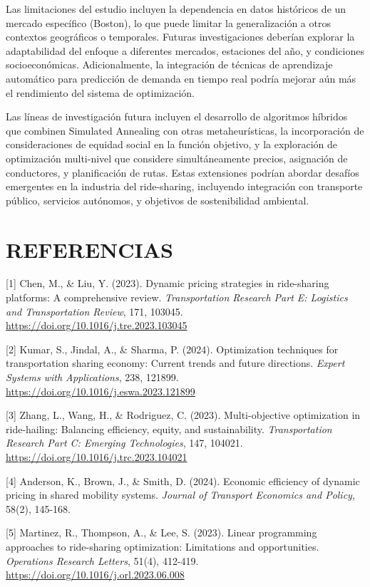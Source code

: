 \documentclass[12pt,a4paper,twocolumn]{article}
\begin{document}
Las limitaciones del estudio incluyen la dependencia en datos históricos de un mercado específico (Boston), lo que puede limitar la generalización a otros contextos geográficos o temporales. Futuras investigaciones deberían explorar la adaptabilidad del enfoque a diferentes mercados, estaciones del año, y condiciones socioeconómicas. Adicionalmente, la integración de técnicas de aprendizaje automático para predicción de demanda en tiempo real podría mejorar aún más el rendimiento del sistema de optimización.

Las líneas de investigación futura incluyen el desarrollo de algoritmos híbridos que combinen Simulated Annealing con otras metaheurísticas, la incorporación de consideraciones de equidad social en la función objetivo, y la exploración de optimización multi-nivel que considere simultáneamente precios, asignación de conductores, y planificación de rutas. Estas extensiones podrían abordar desafíos emergentes en la industria del ride-sharing, incluyendo integración con transporte público, servicios autónomos, y objetivos de sostenibilidad ambiental.

\section{REFERENCIAS}


[1] Chen, M., \& Liu, Y. (2023). Dynamic pricing strategies in ride-sharing platforms: A comprehensive review. \textit{Transportation Research Part E: Logistics and Transportation Review}, 171, 103045. \url{https://doi.org/10.1016/j.tre.2023.103045}

[2] Kumar, S., Jindal, A., \& Sharma, P. (2024). Optimization techniques for transportation sharing economy: Current trends and future directions. \textit{Expert Systems with Applications}, 238, 121899. \url{https://doi.org/10.1016/j.eswa.2023.121899}

[3] Zhang, L., Wang, H., \& Rodriguez, C. (2023). Multi-objective optimization in ride-hailing: Balancing efficiency, equity, and sustainability. \textit{Transportation Research Part C: Emerging Technologies}, 147, 104021. \url{https://doi.org/10.1016/j.trc.2023.104021}

[4] Anderson, K., Brown, J., \& Smith, D. (2024). Economic efficiency of dynamic pricing in shared mobility systems. \textit{Journal of Transport Economics and Policy}, 58(2), 145-168.

[5] Martinez, R., Thompson, A., \& Lee, S. (2023). Linear programming approaches to ride-sharing optimization: Limitations and opportunities. \textit{Operations Research Letters}, 51(4), 412-419. \url{https://doi.org/10.1016/j.orl.2023.06.008}
\end{document}
